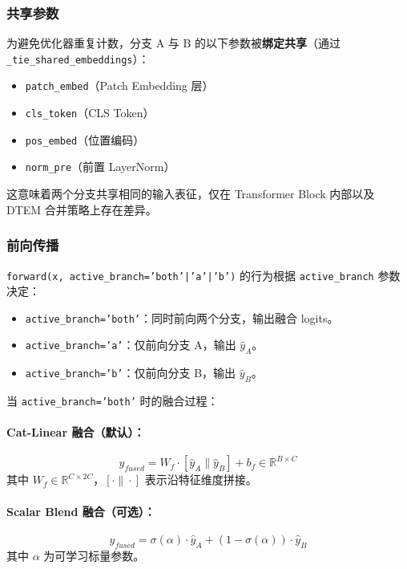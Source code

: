 \documentclass[a4paper,11pt]{article}
\begin{document}
\subsubsection{共享参数}

为避免优化器重复计数，分支 A 与 B 的以下参数被\textbf{绑定共享}（通过 \texttt{\_tie\_shared\_embeddings}）：
\begin{itemize}
    \item \texttt{patch\_embed}（Patch Embedding 层）
    \item \texttt{cls\_token}（CLS Token）
    \item \texttt{pos\_embed}（位置编码）
    \item \texttt{norm\_pre}（前置 LayerNorm）
\end{itemize}

这意味着两个分支共享相同的输入表征，仅在 Transformer Block 内部以及 DTEM 合并策略上存在差异。

\subsubsection{前向传播}

\texttt{forward(x, active\_branch='both'|'a'|'b')} 的行为根据 \texttt{active\_branch} 参数决定：

\begin{itemize}
    \item \texttt{active\_branch='both'}：同时前向两个分支，输出融合 logits。
    \item \texttt{active\_branch='a'}：仅前向分支 A，输出 $\hat{y}_A$。
    \item \texttt{active\_branch='b'}：仅前向分支 B，输出 $\hat{y}_B$。
\end{itemize}

当 \texttt{active\_branch='both'} 时的融合过程：

\paragraph{Cat-Linear 融合（默认）：}
\[
    \hat{y}_{fused} = W_f \cdot [\hat{y}_A \| \hat{y}_B] + b_f \in \mathbb{R}^{B \times C}
\]
其中 $W_f \in \mathbb{R}^{C \times 2C}$，$[\cdot \| \cdot]$ 表示沿特征维度拼接。

\paragraph{Scalar Blend 融合（可选）：}
\[
    \hat{y}_{fused} = \sigma(\alpha) \cdot \hat{y}_A + (1 - \sigma(\alpha)) \cdot \hat{y}_B
\]
其中 $\alpha$ 为可学习标量参数。
\end{document}
